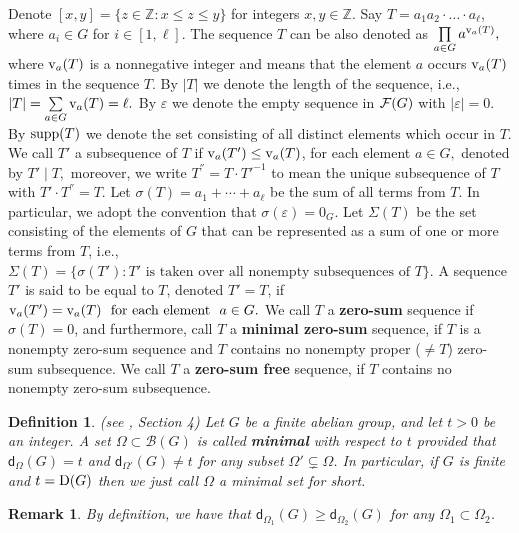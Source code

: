 \documentclass[a4paper, 12pt]{article}
\newtheorem{remark}[theorem]{Remark}
\newtheorem{definition}[theorem]{Definition}
\begin{document}
Denote $[x,y]=\{z\in \mathbb{Z}: x\leq z\leq y\}$ for integers $x,y\in \mathbb{Z}$. Say
$T=a_1a_2\cdot\ldots\cdot a_{\ell}$, where $a_i\in G$ for $i\in [1,\ell]$.
The sequence $T$ can be also denoted as  $\prod\limits_{a\in G}a^{{\rm v}_a(T)},$ where ${\rm v}_a(T)$ is a nonnegative integer and
means that the element $a$ occurs ${\rm v}_a(T)$ times in the sequence $T$. By $|T|$ we denote the length of the sequence, i.e., $|T|=\sum\limits_{a\in G}{\rm v}_a(T)=\ell.$ By $\varepsilon$ we denote the empty sequence in ${\cal F}(G)$ with $|\varepsilon|=0$.
By ${\rm supp}(T)$  we denote the set consisting of all distinct
elements which occur in $T$. We call $T'$
a subsequence of $T$ if ${\rm v}_a(T')\leq {\rm v}_a(T)$, for each element $a\in G,$ denoted by $T'\mid T,$ moreover, we write $T^{''}=T\cdot  T'^{-1}$ to mean the unique subsequence of $T$ with $T'\cdot T^{''}=T$.
Let $\sigma(T)=a_1+\cdots +a_{\ell}$ be the sum of all terms from $T$. In particular, we adopt the convention that $\sigma(\varepsilon)=0_G$.
Let $\Sigma(T)$ be the set consisting of the elements of $G$ that can be represented as a sum of one or more terms from $T$, i.e., $\Sigma(T)=\{\sigma(T'): T' \mbox{ is taken over all nonempty subsequences of }T\}$.
A sequence $T'$ is said to be equal to $T$, denoted $T'=T$, if ${\rm v}_a(T')={\rm v}_a(T)\ \ \mbox{for each element}\ \ a\in G.$ We call $T$ a {\bf zero-sum} sequence if $\sigma(T)=0$, and furthermore, call $T$ a {\bf minimal zero-sum} sequence, if $T$ is a nonempty zero-sum sequence and $T$ contains no nonempty proper ($\neq T$) zero-sum subsequence. We call $T$ a {\bf zero-sum free} sequence, if $T$ contains no nonempty zero-sum subsequence.


\begin{definition}\label{Definition minimal set}  (see \cite{GaoLiPengWang}, Section 4) Let $G$ be a finite abelian group, and let $t>0$ be an integer.  A set $\Omega\subset \mathcal B (G)$ is called {\bf minimal} with respect to $t$ provided that ${\mathsf d}_{\Omega}(G)=t$ and ${\mathsf d}_{\Omega'}(G)\neq t$ for any subset $\Omega'\subsetneq\Omega$.
In particular, if $G$ is finite and $t={\rm D}(G)$ then we just call $\Omega$ a minimal set for short.
\end{definition}

\begin{remark}\label{remark} By definition, we have that ${\mathsf d}_{\Omega_1}(G)\geq {\mathsf d}_{\Omega_2}(G)$ for any $\Omega_1\subset \Omega_2$.
\end{remark}
\end{document}
